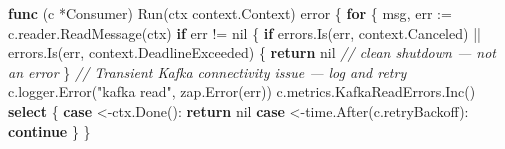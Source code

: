 \documentclass[
]{article}
\newenvironment{Shaded}{}{}
\newcommand{\CommentTok}[1]{\textcolor[rgb]{0.38,0.63,0.69}{\textit{#1}}}
\newcommand{\ControlFlowTok}[1]{\textcolor[rgb]{0.00,0.44,0.13}{\textbf{#1}}}
\newcommand{\DataTypeTok}[1]{\textcolor[rgb]{0.56,0.13,0.00}{#1}}
\newcommand{\KeywordTok}[1]{\textcolor[rgb]{0.00,0.44,0.13}{\textbf{#1}}}
\newcommand{\NormalTok}[1]{#1}
\newcommand{\OperatorTok}[1]{\textcolor[rgb]{0.40,0.40,0.40}{#1}}
\newcommand{\OtherTok}[1]{\textcolor[rgb]{0.00,0.44,0.13}{#1}}
\newcommand{\StringTok}[1]{\textcolor[rgb]{0.25,0.44,0.63}{#1}}
\begin{document}
\begin{Shaded}
\begin{Highlighting}[]
\KeywordTok{func} \OperatorTok{(}\NormalTok{c }\OperatorTok{*}\NormalTok{Consumer}\OperatorTok{)}\NormalTok{ Run}\OperatorTok{(}\NormalTok{ctx context}\OperatorTok{.}\NormalTok{Context}\OperatorTok{)} \DataTypeTok{error} \OperatorTok{\{}
    \ControlFlowTok{for} \OperatorTok{\{}
\NormalTok{        msg}\OperatorTok{,}\NormalTok{ err }\OperatorTok{:=}\NormalTok{ c}\OperatorTok{.}\NormalTok{reader}\OperatorTok{.}\NormalTok{ReadMessage}\OperatorTok{(}\NormalTok{ctx}\OperatorTok{)}
        \ControlFlowTok{if}\NormalTok{ err }\OperatorTok{!=} \OtherTok{nil} \OperatorTok{\{}
            \ControlFlowTok{if}\NormalTok{ errors}\OperatorTok{.}\NormalTok{Is}\OperatorTok{(}\NormalTok{err}\OperatorTok{,}\NormalTok{ context}\OperatorTok{.}\NormalTok{Canceled}\OperatorTok{)} \OperatorTok{||}\NormalTok{ errors}\OperatorTok{.}\NormalTok{Is}\OperatorTok{(}\NormalTok{err}\OperatorTok{,}\NormalTok{ context}\OperatorTok{.}\NormalTok{DeadlineExceeded}\OperatorTok{)} \OperatorTok{\{}
                \ControlFlowTok{return} \OtherTok{nil} \CommentTok{// clean shutdown — not an error}
            \OperatorTok{\}}
            \CommentTok{// Transient Kafka connectivity issue — log and retry}
\NormalTok{            c}\OperatorTok{.}\NormalTok{logger}\OperatorTok{.}\NormalTok{Error}\OperatorTok{(}\StringTok{"kafka read"}\OperatorTok{,}\NormalTok{ zap}\OperatorTok{.}\NormalTok{Error}\OperatorTok{(}\NormalTok{err}\OperatorTok{))}
\NormalTok{            c}\OperatorTok{.}\NormalTok{metrics}\OperatorTok{.}\NormalTok{KafkaReadErrors}\OperatorTok{.}\NormalTok{Inc}\OperatorTok{()}
            \ControlFlowTok{select} \OperatorTok{\{}
            \ControlFlowTok{case} \OperatorTok{\textless{}{-}}\NormalTok{ctx}\OperatorTok{.}\NormalTok{Done}\OperatorTok{():}
                \ControlFlowTok{return} \OtherTok{nil}
            \ControlFlowTok{case} \OperatorTok{\textless{}{-}}\NormalTok{time}\OperatorTok{.}\NormalTok{After}\OperatorTok{(}\NormalTok{c}\OperatorTok{.}\NormalTok{retryBackoff}\OperatorTok{):}
                \ControlFlowTok{continue}
            \OperatorTok{\}}
        \OperatorTok{\}}


\end{Highlighting}
\end{Shaded}
\end{document}
